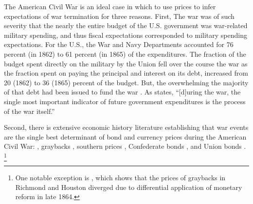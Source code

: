 The American Civil War is an ideal case in which to use prices to infer expectations of war termination for three reasons.
First, The war was of such severity that the nearly the entire budget of the U.S. government was war-related military spending, and thus fiscal expectations corresponded to military spending expectations. %
For the U.S., the War and Navy Departments accounted for 76 percent (in 1862) to 61 percent (in 1865) of the expenditures.
The fraction of the budget spent directly on the military by the Union fell over the course the war as the fraction spent on paying the principal and interest on its debt, increased from 20 (1862) to 36 (1865) percent of the budget.
But, the overwhelming the majority of that debt had been issued to fund the war \parencites{Treasury1861a}{Treasury1861b}{Treasury1862}{Treasury1863}{Treasury1864}{Treasury1865}.
As \textcite[][668]{McCandless1996} states, ``[d]uring the war, the single most important indicator of future government expenditures is the process of the war itself.''

Second, there is extensive economic history literature establishing that war events are the single best determinant of bond and currency prices during the American Civil War:
\parencites{Mitchell1903}{Mitchell1908}{Calomiris1988}{WillardGuinnaneEtAl1996}{McCandless1996}{SmithSmith1997}, graybacks \parencites{Schwab1901}{Weidenmier2002}, southern prices
\parencite{BurdekinLangdana1993}, Confederate bonds \parencites{DavisPecquet1990}{BrownBurdekin2000}{OosterlinckWeidenmier2007}, and Union bonds \parencite{Roll1972}.%
\footnote{One notable exception is \textcite{BurdekinWeidenmier2001}, which shows that the prices of graybacks in Richmond and Houston diverged due to differential application of monetary reform in late 1864.}

